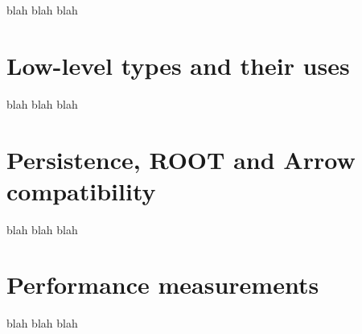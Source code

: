 \documentclass{webofc}
\begin{document}
blah blah blah

\section{Low-level types and their uses}

blah blah blah

\section{Persistence, ROOT and Arrow compatibility}

blah blah blah

\section{Performance measurements}

blah blah blah
\end{document}
